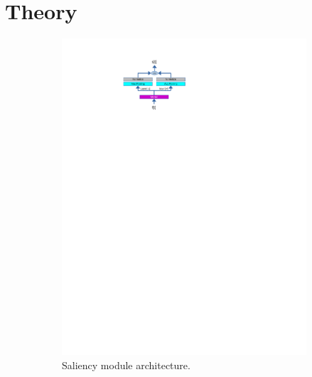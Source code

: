 \section{Theory}
\label{sec:theory}

\fboxsep=1mm%
\fboxrule=1pt%

\begin{figure}[!ht]
	\centering
	\begin{subfigure}{0.27\linewidth}
            \includegraphics[trim=140 580 300 50, clip, width=1.\linewidth]{images/saliency.pdf}
        \caption{Saliency module architecture.}
        \label{fig:arch-saliency}
	\end{subfigure}
	\begin{subfigure}{0.7\linewidth}

\end{subfigure}
\end{figure}

